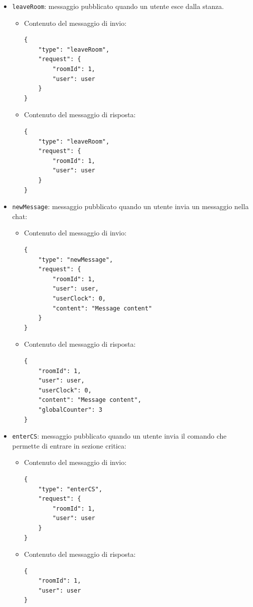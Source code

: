 \documentclass[a4paper]{article}
\begin{document}
\begin{itemize}
    \item \texttt{leaveRoom}: messaggio pubblicato quando un utente esce dalla stanza.
        \begin{itemize}
            \item Contenuto del messaggio di invio:
            \begin{verbatim}
{
    "type": "leaveRoom",
    "request": {
        "roomId": 1,
        "user": user
    } 
}
            \end{verbatim}
            \item Contenuto del messaggio di risposta:
            \begin{verbatim}
{
    "type": "leaveRoom",
    "request": {
        "roomId": 1,
        "user": user
    }
}
            \end{verbatim}
        \end{itemize}       

    \item \texttt{newMessage}: messaggio pubblicato quando un utente invia un messaggio nella chat:
       \begin{itemize}
            \item Contenuto del messaggio di invio:
            \begin{verbatim}
{
    "type": "newMessage",
    "request": {
        "roomId": 1,
        "user": user,
        "userClock": 0,
        "content": "Message content"
    } 
}
            \end{verbatim}
            \item Contenuto del messaggio di risposta:
            \begin{verbatim}
{
    "roomId": 1,
    "user": user,
    "userClock": 0,
    "content": "Message content",
    "globalCounter": 3
}
            \end{verbatim}
        \end{itemize}

    \item \texttt{enterCS}: messaggio pubblicato quando un utente invia il comando che permette di entrare in sezione critica:
       \begin{itemize}
            \item Contenuto del messaggio di invio:
            \begin{verbatim}
{
    "type": "enterCS",
    "request": {
        "roomId": 1,
        "user": user
    } 
}
            \end{verbatim}
            \item Contenuto del messaggio di risposta:
            \begin{verbatim}
{
    "roomId": 1,
    "user": user
}
            \end{verbatim}
        \end{itemize}


\end{itemize}
\end{document}
